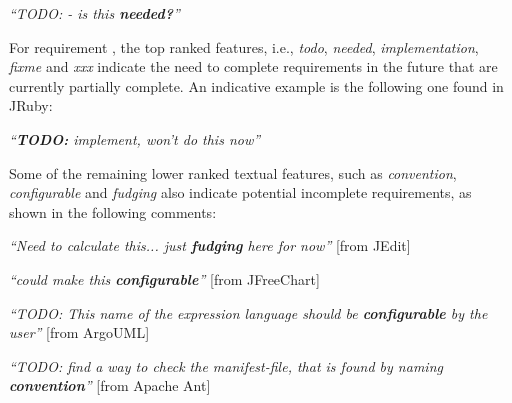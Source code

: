 \vspace{1mm}
\begin{displayquote}
\textit{``TODO: - is this \textbf{needed?}''}
\end{displayquote}
\vspace{1mm}

For requirement \SATD, the top ranked features, i.e., \textit{todo}, \textit{needed}, \textit{implementation}, \textit{fixme} and \textit{xxx} indicate the need to complete requirements in the future that are currently partially complete. An indicative example is the following one found in JRuby:

\vspace{1mm}
\begin{displayquote}
\textit{``\textbf{TODO:} implement, won't do this now''}
\end{displayquote}
\vspace{1mm}

Some of the remaining lower ranked textual features, such as \textit{convention}, \textit{configurable} and \textit{fudging} also indicate potential incomplete requirements, as shown in the following comments:

\vspace{1mm}
\begin{displayquote}
\textit{``Need to calculate this... just \textbf{fudging} here for now''} [from JEdit]
\end{displayquote}
\vspace{1mm}
\begin{displayquote}
\textit{``could make this \textbf{configurable}''} [from JFreeChart]
\end{displayquote}
\vspace{1mm}
\begin{displayquote}
\textit{``TODO: This name of the expression language should be \textbf{configurable} by the user''} [from ArgoUML]
\end{displayquote}
\vspace{1mm}
\begin{displayquote}
\textit{``TODO: find a way to check the manifest-file, that is found by naming \textbf{convention}''} [from Apache Ant]
\end{displayquote}
\vspace{1mm}

